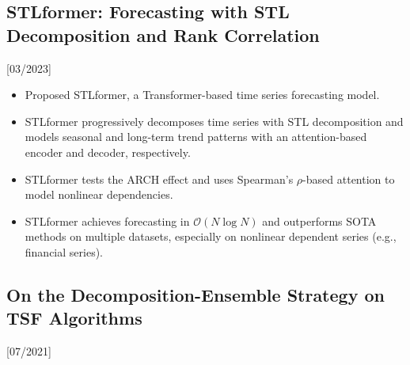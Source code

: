 \documentclass{mycv}
\begin{document}
\subsection{STLformer: Forecasting with STL Decomposition and Rank Correlation}[03/2023]

\vspace{-\parskip}

\begin{itemize}
  \item Proposed STLformer, a Transformer-based time series forecasting model.
  \item STLformer progressively decomposes time series with STL decomposition and models seasonal and long-term trend patterns with an attention-based encoder and decoder, respectively.
  \item STLformer tests the ARCH effect and uses Spearman's $\rho$-based attention to model nonlinear dependencies.
  \item STLformer achieves forecasting in $\mathcal{O}(N \log{N})$ and outperforms SOTA methods on multiple datasets, especially on nonlinear dependent series (e.g., financial series).
\end{itemize}





\vspace{-\parskip}

\subsection{On the Decomposition-Ensemble Strategy on TSF Algorithms}[07/2021]
\end{document}
